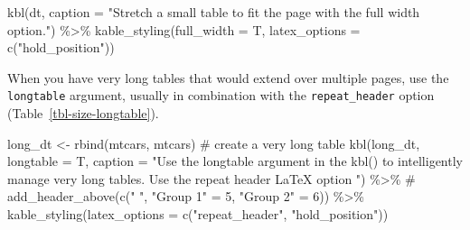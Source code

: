 \documentclass[
  letterpaper,
  DIV=11,
  numbers=noendperiod]{scrartcl}
\newenvironment{Shaded}{\begin{snugshade}}{\end{snugshade}}
\newcommand{\AttributeTok}[1]{\textcolor[rgb]{0.40,0.45,0.13}{#1}}
\newcommand{\CommentTok}[1]{\textcolor[rgb]{0.37,0.37,0.37}{#1}}
\newcommand{\FunctionTok}[1]{\textcolor[rgb]{0.28,0.35,0.67}{#1}}
\newcommand{\NormalTok}[1]{\textcolor[rgb]{0.00,0.23,0.31}{#1}}
\newcommand{\OtherTok}[1]{\textcolor[rgb]{0.00,0.23,0.31}{#1}}
\newcommand{\SpecialCharTok}[1]{\textcolor[rgb]{0.37,0.37,0.37}{#1}}
\newcommand{\StringTok}[1]{\textcolor[rgb]{0.13,0.47,0.30}{#1}}
\begin{document}
\begin{Shaded}
\begin{Highlighting}[]
\FunctionTok{kbl}\NormalTok{(dt, }
    \AttributeTok{caption =} \StringTok{"Stretch a small table to fit the page with the full width option."}\NormalTok{) }\SpecialCharTok{\%\textgreater{}\%}
  \FunctionTok{kable\_styling}\NormalTok{(}\AttributeTok{full\_width =}\NormalTok{ T, }\AttributeTok{latex\_options =} \FunctionTok{c}\NormalTok{(}\StringTok{"hold\_position"}\NormalTok{))}
\end{Highlighting}
\end{Shaded}

\begin{table}

\caption{\label{tbl-size-fullwidth}}


\end{table}%

When you have very long tables that would extend over multiple pages,
use the \texttt{longtable} argument, usually in combination with the
\texttt{repeat\_header} option (Table~\ref{tbl-size-longtable}).

\begin{Shaded}
\begin{Highlighting}[]
\NormalTok{long\_dt }\OtherTok{\textless{}{-}} \FunctionTok{rbind}\NormalTok{(mtcars, mtcars) }\CommentTok{\# create a very long table}
\FunctionTok{kbl}\NormalTok{(long\_dt, }
    \AttributeTok{longtable =}\NormalTok{ T, }
    \AttributeTok{caption =} \StringTok{"Use the \textquotesingle{}longtable\textquotesingle{} argument in the kbl() to intelligently manage very long tables. Use the repeat header LaTeX option "}\NormalTok{) }\SpecialCharTok{\%\textgreater{}\%}
 \CommentTok{\# add\_header\_above(c(" ", "Group 1" = 5, "Group 2" = 6)) \%\textgreater{}\%}
  \FunctionTok{kable\_styling}\NormalTok{(}\AttributeTok{latex\_options =} \FunctionTok{c}\NormalTok{(}\StringTok{"repeat\_header"}\NormalTok{, }\StringTok{"hold\_position"}\NormalTok{))}
\end{Highlighting}
\end{Shaded}
\end{document}
